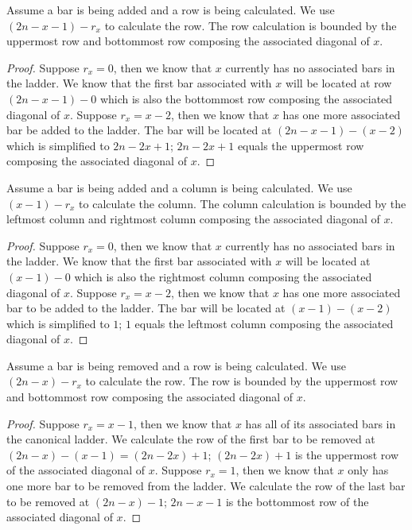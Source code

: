 {%
\begin{lemma}
  Assume a bar is being added and a row is being calculated. 
  We use $(2n - x - 1) - r_{x}$ to calculate the row. The row calculation is bounded by the uppermost row and bottommost row composing the associated diagonal of $x$. 
  \label{Lemma:Case1}
\end{lemma}
\begin{proof}
   Suppose $r_{x}=0$, then we know that $x$ currently has no associated bars in the ladder. 
   We know that the first bar associated with $x$ will 
   be located at row $(2n-x-1)-0$ which is also the bottommost row composing the associated diagonal of $x$.  
   Suppose $r_{x}=x-2$, then we know that $x$ has one more associated bar be added to the ladder. The bar will be located at 
   $(2n - x - 1) - (x-2)$ which is simplified to $2n-2x+1$; $2n-2x+1$ equals the uppermost row composing the associated diagonal of $x$.  
\end{proof}

\begin{lemma}
  Assume a bar is being added and a column is being calculated. 
  We use $(x-1)-r_{x}$ to calculate the column. The column calculation is bounded by the leftmost column and rightmost column 
  composing the associated diagonal of $x$. 
  \label{Lemma:Case2}
\end{lemma}
\begin{proof}
  Suppose $r_{x}=0$, then we know that $x$ currently has no associated bars in the ladder. 
  We know that the first bar associated with $x$ will be located at $(x-1)-0$ which is also the rightmost column composing the associated 
  diagonal of $x$. Suppose $r_{x} = x-2$, then we know that $x$ has one more associated bar to be added to the ladder. The bar will 
  be located at $(x-1)-(x-2)$ which is simplified to $1$; $1$ equals the leftmost column composing the associated diagonal of $x$.

\end{proof}

\begin{lemma}
  Assume a bar is being removed and a row is being calculated. 
  We use $(2n - x)-r_{x}$ to calculate the row. The row is bounded by the uppermost row and bottommost row composing the 
  associated diagonal of $x$.
  \label{Lemma:Case3} 
  
\end{lemma}
\begin{proof}
  Suppose $r_{x}=x-1$, then we know that $x$ has all of its associated bars in the canonical ladder. We calculate the row of the first bar to 
  be removed at $(2n-x)-(x-1)=(2n - 2x)+1$; $(2n - 2x)+1$ is the uppermost row of the associated diagonal of $x$. Suppose $r_{x}=1$, then we know that 
  $x$ only has one more bar to be removed from the ladder. We calculate the row of the last bar to be removed at $(2n-x)-1$; $2n-x-1$ is the bottommost 
  row of the associated diagonal of $x$. 


\end{proof}}
